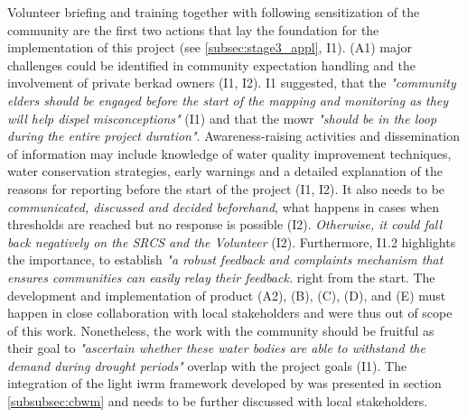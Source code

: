 Volunteer briefing and training together with following sensitization of the community are the first two actions that lay the foundation for the implementation of this project (see \ref*{subsec:stage3_appl}, I1). (A1) major challenges could be identified in community expectation handling and the involvement of private berkad owners (I1, I2). I1 suggested, that the \textit{"community elders should be engaged before the start of the mapping and monitoring as they will help dispel misconceptions"} (I1) and that the \acrshort{mowr} \textit{"should be in the loop during the entire project duration"}. Awareness-raising activities and dissemination of information may include knowledge of water quality improvement techniques, water conservation strategies, early warnings and a detailed explanation of the reasons for reporting before the start of the project (I1, I2). It also needs to be \textit{communicated, discussed and decided beforehand},  what happens in cases when thresholds are reached but no response is possible (I2). \textit{Otherwise, it could fall back negatively on the SRCS and the Volunteer} (I2). Furthermore, I1.2 highlights the importance, to establish \textit{"a robust feedback and complaints mechanism that ensures communities can easily relay their feedback.} right from the start. The development and implementation of product (A2), (B), (C), (D), and (E) must happen in close collaboration with local stakeholders and were thus out of scope of this work. Nonetheless, the work with the community should be fruitful as their goal to \textit{"ascertain whether these water bodies are able to withstand the demand during drought periods"} overlap with the project goals (I1).\newline
The integration of the light \acrshort{iwrm} framework developed by \autocite{dayCommunitybasedWaterResources2009} was presented in section \ref*{subsubsec:cbwm} and needs to be further discussed with local stakeholders.




